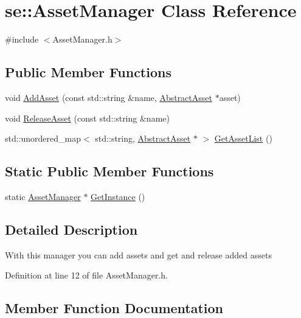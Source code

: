 \hypertarget{classse_1_1_asset_manager}{}\section{se\+:\+:Asset\+Manager Class Reference}
\label{classse_1_1_asset_manager}


{\ttfamily \#include $<$Asset\+Manager.\+h$>$}

\subsection*{Public Member Functions}
\begin{DoxyCompactItemize}
\item 
void \mbox{\hyperlink{classse_1_1_asset_manager_aee43a38dbf19e852fed3f222808277af}{Add\+Asset}} (const std\+::string \&name, \mbox{\hyperlink{classse_1_1_abstract_asset}{Abstract\+Asset}} $\ast$asset)
\item 
void \mbox{\hyperlink{classse_1_1_asset_manager_a3cd3506b7003d63adbd1cd0f94c8931e}{Release\+Asset}} (const std\+::string \&name)
\item 
std\+::unordered\+\_\+map$<$ std\+::string, \mbox{\hyperlink{classse_1_1_abstract_asset}{Abstract\+Asset}} $\ast$ $>$ \mbox{\hyperlink{classse_1_1_asset_manager_adaa14ad4d80b328f2204543d788c6a28}{Get\+Asset\+List}} ()
\end{DoxyCompactItemize}
\subsection*{Static Public Member Functions}
\begin{DoxyCompactItemize}
\item 
static \mbox{\hyperlink{classse_1_1_asset_manager}{Asset\+Manager}} $\ast$ \mbox{\hyperlink{classse_1_1_asset_manager_abcccad608538c6ddeb223c259089d468}{Get\+Instance}} ()
\end{DoxyCompactItemize}


\subsection{Detailed Description}
With this manager you can add assets and get and release added assets 

Definition at line 12 of file Asset\+Manager.\+h.



\subsection{Member Function Documentation}
\mbox{\label{classse_1_1_asset_manager_aee43a38dbf19e852fed3f222808277af}} 
